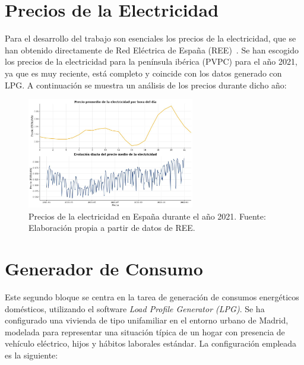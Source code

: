\section{Precios de la Electricidad}
Para el desarrollo del trabajo son esenciales los precios de la electricidad, que se han obtenido
directamente de Red Eléctrica de España (REE)~\cite{pvpc_csv_2024}. Se han escogido los precios de 
la electricidad para la península ibérica (PVPC) para el año 2021, ya que es muy reciente, está
completo y coincide con los datos generado con LPG. A continuación se muestra un análisis de los 
precios durante dicho año:
\begin{figure}[H]
    \centering
    \includegraphics[width=0.65\textwidth]{images/preciosElectricidad.jpg}
    \caption{Precios de la electricidad en España durante el año 2021. Fuente: Elaboración propia a partir de datos de REE.}
    \label{fig:precios_electricidad}
\end{figure}

\section{Generador de Consumo}
Este segundo bloque se centra en la tarea de generación de consumos energéticos domésticos,
utilizando el software \textit{Load Profile Generator (LPG)}. Se ha configurado una vivienda de
tipo unifamiliar en el entorno urbano de Madrid, modelada para representar una situación típica
de un hogar con presencia de vehículo eléctrico, hijos y hábitos laborales estándar. La configuración
empleada es la siguiente:

